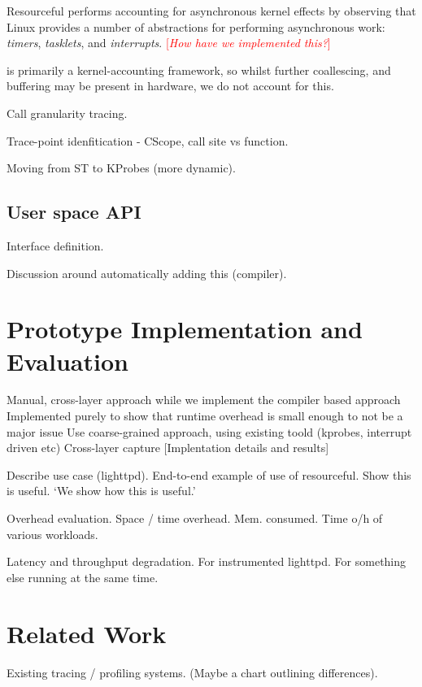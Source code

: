 \documentclass[letterpaper,twocolumn,10pt]{article}
\newcommand{\pname}{Resourceful}
\newcommand{\lnote}[1]{\textcolor{red}{[\textit{#1}]}} %
\begin{document}
\pname{ } performs accounting for asynchronous kernel effects by observing that Linux provides a number of abstractions for performing asynchronous work: \emph{timers}, \emph{tasklets}, and \emph{interrupts}.
\lnote{How have we implemented this?}

\panme{ } is primarily a kernel-accounting framework, so whilst further coallescing, and buffering may be present in hardware, we do not account for this.


Call granularity tracing.

Trace-point idenfitication - CScope, call site vs function.

Moving from ST to KProbes (more dynamic).

\subsection{User space API}
Interface definition.

Discussion around automatically adding this (compiler).	

\section{Prototype Implementation and Evaluation}
Manual, cross-layer approach while we implement the compiler based approach
Implemented purely to show that runtime overhead is small enough to not be a major issue
Use coarse-grained approach, using existing toold (kprobes, interrupt driven etc)
Cross-layer capture
[Implentation details and results]

Describe use case (lighttpd).\newline
End-to-end example of use of resourceful. Show this is useful. `We show how this
is useful.'

Overhead evaluation.\newline
Space / time overhead. Mem. consumed. Time o/h of various workloads.

Latency and throughput degradation.\newline
For instrumented lighttpd. For something else running at the same time.


\section{Related Work}
Existing tracing / profiling systems. (Maybe a chart outlining differences).
\end{document}
